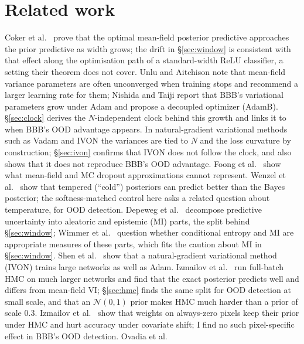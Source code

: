 \documentclass[11pt]{article}
\begin{document}
\section{Related work}
Coker et al.\ \citep{coker2022wide} prove that the optimal mean-field
posterior predictive approaches the prior predictive as width grows; the drift
in \S\ref{sec:window} is consistent with that effect along the optimisation
path of a standard-width ReLU classifier, a setting their theorem does not cover. Unlu and Aitchison \citep{unlu2020variational} note
that mean-field variance parameters are often unconverged when training stops
and recommend a larger learning rate for them; Nishida and Taiji
\citep{nishida2022adamb} report that BBB's variational parameters grow under
Adam and propose a decoupled optimizer (AdamB). \S\ref{sec:clock} derives
the $N$-independent clock behind this growth and links it to when BBB's OOD
advantage appears. In natural-gradient variational methods such as Vadam
\citep{khan2018fast} and IVON \citep{shen2024variational} the variances are
tied to $N$ and the loss curvature by construction; \S\ref{sec:ivon} confirms
that IVON does not follow the clock, and also shows that it does not reproduce
BBB's OOD advantage. Foong et al.\
\citep{foong2020expressiveness} show what mean-field and MC dropout
approximations cannot represent. Wenzel et al.\ \citep{wenzel2020good} show
that tempered (``cold'') posteriors can predict better than the Bayes
posterior; the softness-matched control here asks a related question about
temperature, for OOD detection. Depeweg et al.\ \citep{depeweg2018decomposition}
decompose predictive uncertainty into aleatoric and epistemic (MI) parts, the
split behind \S\ref{sec:window}; Wimmer et al.\ \citep{wimmer2023quantifying}
question whether conditional entropy and MI are appropriate measures of these
parts, which fits the caution about MI in \S\ref{sec:window}. Shen et al.\ \citep{shen2024variational}
show that a natural-gradient variational method (IVON) trains large networks
as well as Adam. Izmailov et al.\ \citep{izmailov2021what} run full-batch HMC on
much larger networks and find that the exact posterior predicts well and
differs from mean-field VI; \S\ref{sec:hmc} finds the same split for OOD
detection at small scale, and that an $\mathcal N(0,1)$ prior makes HMC much
harder than a prior of scale 0.3. Izmailov et al.\
\citep{izmailov2021dangers} show that weights on always-zero pixels keep their
prior under HMC and hurt accuracy under covariate shift; I find no such
pixel-specific effect in BBB's OOD detection. Ovadia et al.\
\end{document}
